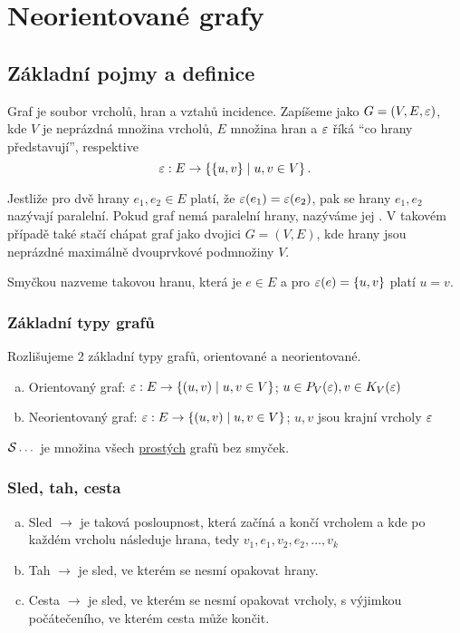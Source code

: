 \section{Neorientované grafy}

\subsection{Základní pojmy a definice}
Graf je soubor vrcholů, hran a vztahů incidence. Zapíšeme jako $G = (V, E, \eps)$, kde $V$ je neprázdná množina vrcholů, 
$E$ množina hran a $\eps$ říká \enquote{co hrany představují}, respektive
\begin{equation}
    \eps: E \rightarrow \bc{\bc{u, v} \mid u, v \in V}.
\end{equation}

Jestliže pro dvě hrany $e_1, e_2 \in E$ platí, že $\eps(e_1) = \eps(e_2)$, pak se hrany $e_1, e_2$ nazývají paralelní.
Pokud graf nemá paralelní hrany, nazýváme jej . V takovém případě také stačí chápat graf jako dvojici 
$G = (V,E)$, kde hrany jsou neprázdné maximálně dvouprvkové podmnožiny $V$.\label{prosty}

Smyčkou nazveme takovou hranu, která je $e \in E$ a pro $\eps(e) = \bc{u,v}$ platí $u=v$. \label{smycka}

\subsubsection{Základní typy grafů}
Rozlišujeme 2 základní typy grafů, orientované a neorientované.
\begin{enumerate}[(a)]
    \item Orientovaný graf: $\eps: E \rightarrow \bc{(u,v) \mid u,v \in V}$; $u \in P_V(\eps), v \in K_V(\eps)$
    \item Neorientovaný graf: $\eps: E \rightarrow \bc{(u,v) \mid u,v \in V}$; $u,v$ jsou krajní vrcholy $\eps$
\end{enumerate}
$\S \dots$ je množina všech \hyperref[prosty]{prostých} grafů bez smyček.

\subsubsection{Sled, tah, cesta}\label{stc}
\begin{enumerate}[(a)]
    \item Sled $\rightarrow$ je taková posloupnost, která začíná a končí vrcholem a kde po každém vrcholu následuje 
    hrana, tedy $v_1, e_1, v_2, e_2, \dots, v_k$
    \item Tah $\rightarrow$ je sled, ve kterém se nesmí opakovat hrany.
    \item Cesta $\rightarrow$ je sled, ve kterém se nesmí opakovat vrcholy, s výjimkou počátečeního, ve kterém cesta 
    může končit.
\end{enumerate}

